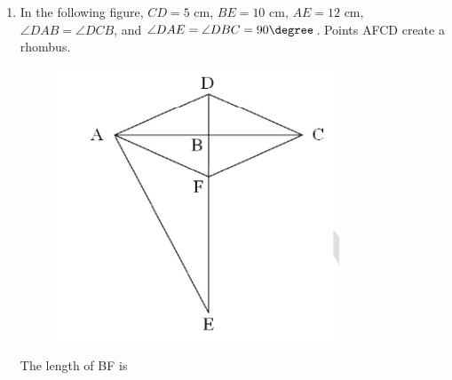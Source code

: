 \documentclass[journal,12pt,onecolumn]{IEEEtran}
\theoremstyle{remark}
\begin{document}
\begin{enumerate}[start=1, label=Q.\arabic*]
    \item In the following figure, $CD = 5$ cm, $BE = 10$ cm, $AE = 12$ cm, $\angle DAB = \angle DCB$, and $\angle DAE = \angle DBC = 90\degree$. Points AFCD create a rhombus.
    \begin{figure}[H]
        \centering
        \includegraphics[width=0.3\columnwidth]{Figures/q7.png}
        \caption*{}
    \end{figure}
    The length of BF  is
    \begin{enumerate}
    \end{enumerate}

    \hfill{}


\end{enumerate}
\end{document}
